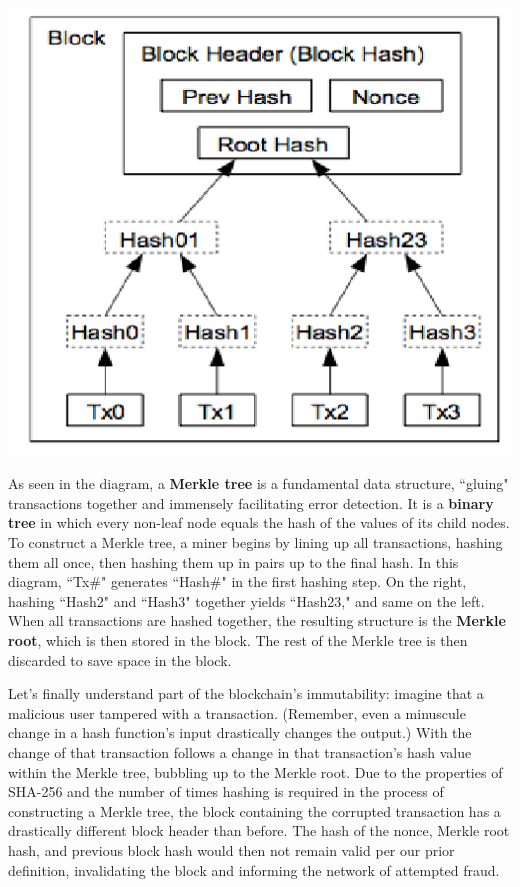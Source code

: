 \documentclass[full.tex]{subfiles}
\begin{document}
   
   \medskip
   \begin{center}
   \includegraphics[scale=0.6]{merkle}
   \end{center}
   \smallskip
   
   As seen in the diagram, a \textbf{Merkle tree} is a fundamental data structure, ``gluing" transactions together and immensely facilitating error detection. It is a \textbf{binary tree} in which every non-leaf node equals the hash of the values of its child nodes. To construct a Merkle tree, a miner begins by lining up all transactions, hashing them all once, then hashing them up in pairs up to the final hash. In this diagram, ``Tx\#" generates ``Hash\#" in the first hashing step. On the right, hashing ``Hash2" and ``Hash3" together yields ``Hash23," and same on the left. When all transactions are hashed together, the resulting structure is the \textbf{Merkle root}, which is then stored in the block. The rest of the Merkle tree is then discarded to save space in the block.
   
   Let's finally understand part of the blockchain's immutability: imagine that a malicious user tampered with a transaction. (Remember, even a minuscule change in a hash function's input drastically changes the output.) With the change of that transaction follows a change in that transaction's hash value within the Merkle tree, bubbling up to the Merkle root. Due to the properties of SHA-256 and the number of times hashing is required in the process of constructing a Merkle tree, the block containing the corrupted transaction has a drastically different block header than before. The hash of the nonce, Merkle root hash, and previous block hash would then not remain valid per our prior definition, invalidating the block and informing the network of attempted fraud.
   
\end{document}
